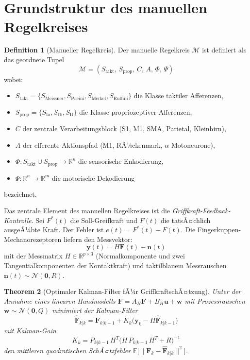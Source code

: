 ﻿\documentclass[12pt,a4paper]{report}
\theoremstyle{plain}
\newtheorem{theorem}{Theorem}[section]
\theoremstyle{definition}
\newtheorem{definition}[theorem]{Definition}
\theoremstyle{remark}
\begin{document}
\section{Grundstruktur des manuellen Regelkreises}

\begin{definition}[Manueller Regelkreis]
\label{def:regelkreis}
Der manuelle Regelkreis $\mathcal{M}$ ist definiert als das geordnete
Tupel
\[
  \mathcal{M} = (S_{\text{takt}},\, S_{\text{prop}},\, C,\, A,\, \Phi,\, \Psi)
\]
wobei:
\begin{itemize}
\item $S_{\text{takt}} = \{S_{\mathrm{Meissner}}, S_{\mathrm{Pacini}},
  S_{\mathrm{Merkel}}, S_{\mathrm{Ruffini}}\}$ die Klasse taktiler
  Afferenzen,
\item $S_{\text{prop}} = \{S_{\mathrm{Ia}}, S_{\mathrm{Ib}}, S_{\mathrm{II}}\}$
  die Klasse propriozeptiver Afferenzen,
\item $C$ der zentrale Verarbeitungsblock (S1, M1, SMA, Parietal, Kleinhirn),
\item $A$ der efferente Aktionspfad (M1, RÃ¼ckenmark, $\alpha$-Motoneurone),
\item $\Phi: S_{\text{takt}} \cup S_{\text{prop}} \to \mathbb{R}^n$
  die sensorische Enkodierung,
\item $\Psi: \mathbb{R}^n \to \mathbb{R}^m$ die motorische Dekodierung
\end{itemize}
bezeichnet.
\end{definition}

Das zentrale Element des manuellen Regelkreises ist die
\emph{Griffkraft-Feedback-Kontrolle}. Sei $F^*(t)$ die Soll-Greifkraft
und $F(t)$ die tatsÃ¤chlich ausgeÃ¼bte Kraft. Der Fehler ist
$e(t) = F^*(t) - F(t)$. Die Fingerkuppen-Mechanorezeptoren liefern
den Messvektor:
\[
  \mathbf{y}(t) = H \mathbf{F}(t) + \mathbf{n}(t)
\]
mit der Messmatrix $H \in \mathbb{R}^{p \times 3}$ (Normalkomponente und
zwei Tangentialkomponenten der Kontaktkraft) und taktilblauem
Messrauschen $\mathbf{n}(t) \sim \mathcal{N}(\mathbf{0}, R)$.

\begin{theorem}[Optimaler Kalman-Filter fÃ¼r GriffkraftschÃ¤tzung]
\label{thm:kalman}
Unter der Annahme eines linearen Handmodells
$\dot{\mathbf{F}} = A_H \mathbf{F} + B_H \mathbf{u} + \mathbf{w}$ mit
Prozessrauschen $\mathbf{w} \sim \mathcal{N}(\mathbf{0}, Q)$ minimiert
der Kalman-Filter
\[
  \hat{\mathbf{F}}_{k|k} = \hat{\mathbf{F}}_{k|k-1}
    + K_k \bigl(\mathbf{y}_k - H \hat{\mathbf{F}}_{k|k-1}\bigr)
\]
mit Kalman-Gain
\[
  K_k = P_{k|k-1}\, H^T \bigl(H\, P_{k|k-1}\, H^T + R\bigr)^{-1}
\]
den mittleren quadratischen SchÃ¤tzfehler
$\mathbb{E}\bigl[\|\mathbf{F}_k - \hat{\mathbf{F}}_{k|k}\|^2\bigr]$.
\end{theorem}
\end{document}
